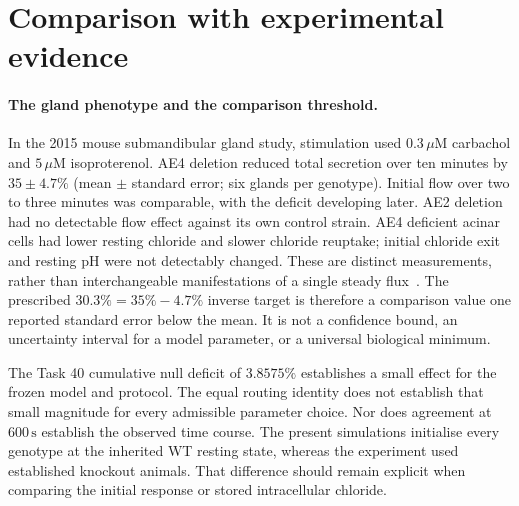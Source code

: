 \section{Comparison with experimental evidence}
\label{sec:literature-comparison}

\paragraph{The gland phenotype and the comparison threshold.}
In the 2015 mouse submandibular gland study, stimulation used
$0.3\,\mu\mathrm{M}$ carbachol and $5\,\mu\mathrm{M}$ isoproterenol.
AE4 deletion reduced total secretion over ten minutes by
$35\pm4.7\%$ (mean $\pm$ standard error; six glands per genotype).
Initial flow over two to three minutes was comparable, with the deficit
developing later. AE2 deletion had no detectable flow effect against its
own control strain. AE4 deficient acinar cells had lower resting chloride
and slower chloride reuptake; initial chloride exit and resting pH were
not detectably changed. These are distinct measurements, rather than
interchangeable manifestations of a single steady flux~\cite{Pena2015}.
The prescribed $30.3\%=35\%-4.7\%$ inverse target is therefore a
comparison value one reported standard error below the mean. It is not
a confidence bound, an uncertainty interval for a model parameter, or
a universal biological minimum.

The Task 40 cumulative null deficit of $3.8575\%$ establishes a small
effect for the frozen model and protocol. The equal routing identity
does not establish that small magnitude for every admissible parameter
choice. Nor does agreement at $600\,\mathrm{s}$ establish the observed
time course. The present simulations initialise every genotype at the
inherited WT resting state, whereas the experiment used established
knockout animals. That difference should remain explicit when comparing
the initial response or stored intracellular chloride.

